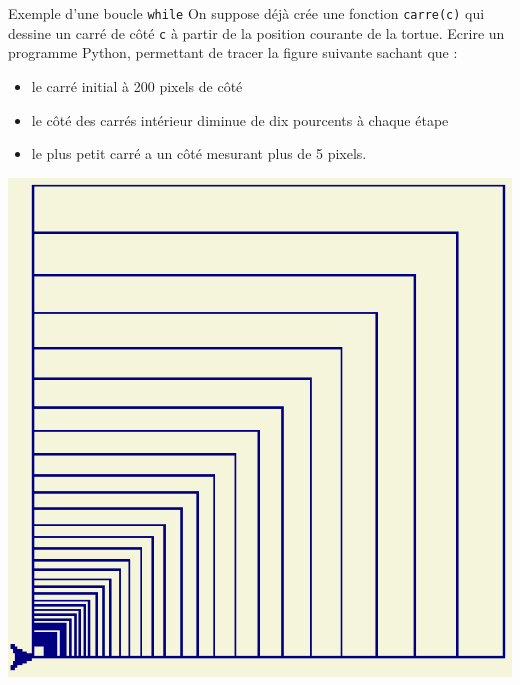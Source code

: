 \documentclass[10pt]{beamer}
\begin{document}
\begin{frame}[fragile]
	\mframe{\Python}
	\begin{exampleblock}{Exemple d'une boucle {\tt while}}
		On suppose déjà crée une fonction {\tt carre(c)} qui dessine un carré de côté {\tt c} à partir de la position courante de la tortue.
		Ecrire un programme Python, permettant de tracer la figure suivante sachant que : 
		\begin{itemize}
		\item le carré initial à 200 pixels de côté
		\item le côté des carrés intérieur diminue de dix pourcents à chaque étape
		\item le plus petit carré a un côté mesurant plus de 5 pixels.
		\end{itemize}
		\begin{center}
			\includegraphics[scale=0.3]{ex_cours.eps}
		\end{center}
	\end{exampleblock}
\end{frame}
\end{document}
